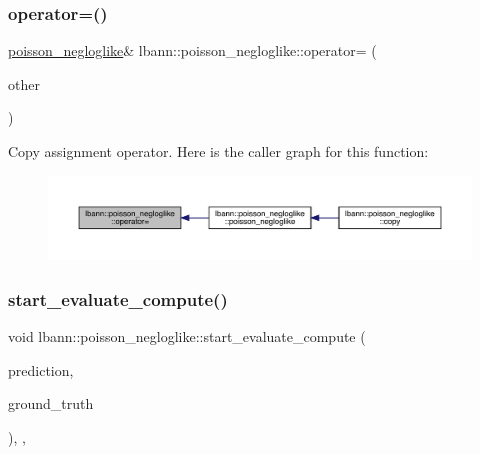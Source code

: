 \subsubsection{\texorpdfstring{operator=()}{operator=()}}
{\footnotesize\ttfamily \hyperlink{classlbann_1_1poisson__negloglike}{poisson\+\_\+negloglike}\& lbann\+::poisson\+\_\+negloglike\+::operator= (\begin{DoxyParamCaption}\item[{const \hyperlink{classlbann_1_1poisson__negloglike}{poisson\+\_\+negloglike} \&}]{other }\end{DoxyParamCaption})\hspace{0.3cm}{\ttfamily [default]}}

Copy assignment operator. Here is the caller graph for this function\+:\nopagebreak
\begin{figure}[H]
\begin{center}
\leavevmode
\includegraphics[width=350pt]{classlbann_1_1poisson__negloglike_a1a4e084da868ff7e353f842662dd5e9a_icgraph}
\end{center}
\end{figure}
\mbox{\label{classlbann_1_1poisson__negloglike_ad69c0a20f5015ee02eb0c20e87129ffa}} 
\subsubsection{\texorpdfstring{start\+\_\+evaluate\+\_\+compute()}{start\_evaluate\_compute()}}
{\footnotesize\ttfamily void lbann\+::poisson\+\_\+negloglike\+::start\+\_\+evaluate\+\_\+compute (\begin{DoxyParamCaption}\item[{const \hyperlink{base_8hpp_a9a697a504ae84010e7439ffec862b470}{Abs\+Dist\+Mat} \&}]{prediction,  }\item[{const \hyperlink{base_8hpp_a9a697a504ae84010e7439ffec862b470}{Abs\+Dist\+Mat} \&}]{ground\+\_\+truth }\end{DoxyParamCaption})\hspace{0.3cm}{\ttfamily [inline]}, {\ttfamily [override]}, {\ttfamily [virtual]}}

